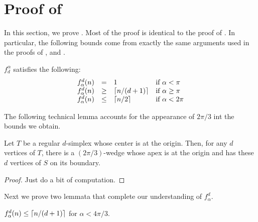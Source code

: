 \documentclass[lotsofwhite]{patmorin}
\begin{document}
\section{Proof of }

In this section, we prove .  Most of the proof is
identical to the proof of .  In particular, the
following bounds come from exactly the same arguments used in the
proofs of ,  and .

\begin{lem}
$f^\alpha_d$ satisfies the following:
\[\begin{array}{lcll}
  f^d_\alpha(n) & = & 1 & \mbox{if $\alpha < \pi$} \\
  f^d_\alpha(n) & \ge & \left\lceil n/(d+1) \right\rceil & \mbox{if $\alpha \ge \pi$} \\
  f^d_\alpha(n) & \le & \left\lceil n/2 \right\rceil & \mbox{if $\alpha < 2\pi$} \\
\end{array}\]
\end{lem}

The following technical lemma accounts for the appearance of $2\pi/3$
int the bounds we obtain.

\begin{lem}
Let $T$ be a regular $d$-simplex whose center is at the origin.  Then,
for any $d$ vertices of $T$, there is a $(2\pi/3)$-wedge whose apex is
at the origin and has these $d$ vertices of $S$ on its boundary.
\end{lem}

\begin{proof}
Just do a bit of computation.
\end{proof}

Next we prove two lemmata that complete our understanding of $f_\alpha^d$.

\begin{lem}
$f^d_\alpha(n) \le \left\lceil n/(d+1) \right\rceil$ for $\alpha < 4\pi/3$.
\end{lem}
\end{document}
